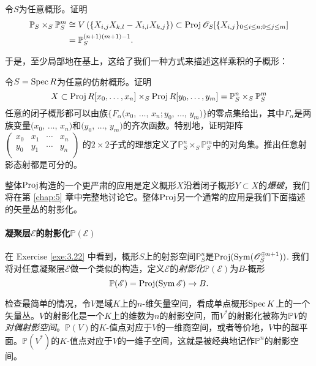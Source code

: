 \begin{exe}\label{exe:3.23}
令$S$为任意概形。证明
\begin{align*}
\mathbb P_S\times_S \mathbb P_S^m &\cong V\left(\{X_{i,j}X_{k,l}-X_{i,l}X_{k,j}\}\right)\subset \operatorname{Proj} \mathscr{O}_S[\{X_{i,j}\}_{0\leq i\leq n;0\leq j\leq m}]\\
& = \mathbb P_S^{(n+1)(m+1)-1}.
\end{align*}
\end{exe}

于是，至少局部地在基上，这给了我们一种方式来描述这样乘积的子概形：

\begin{exe}\label{exe:3.24}
令$S=\operatorname{Spec} R$为任意的仿射概形。证明
\[
	X\subset \operatorname{Proj} R[x_0,\dots,x_n]\times_S \operatorname{Proj} R[y_0,\dots,y_m]=\mathbb P^n_S\times_S\mathbb P^m_S
\]
任意的闭子概形都可以由族$\{F_\alpha(x_0$, $\dots$, $x_n;y_0$, $\dots$, $y_m)\}$的零点集给出，其中$F_{\alpha}$是两族变量$(x_0$, $\dots$, $x_n)$和$(y_0$, $\dots$, $y_m)$的齐次函数。特别地，证明矩阵
$
\begin{pmatrix}
x_0&x_1&\cdots &x_n\\
y_0&y_1&\cdots &y_n\\
\end{pmatrix}
$
的$2\times 2$子式的理想定义了$\mathbb P^n_S\times_S\mathbb P^m_S$中的对角集。推出任意射影态射都是可分的。
\end{exe}

整体$\operatorname{Proj}$构造的一个更严肃的应用是定义概形$X$沿着闭子概形$Y\subset X$的\textit{爆破}，我们将在第 \ref{chap:5} 章中完整地讨论它。整体$\operatorname{Proj}$另一个通常的应用是我们下面描述的矢量丛的射影化。

\paragraph*{凝聚层\texorpdfstring{$\mathscr E$}{E}的射影化\texorpdfstring{$\mathbb P(\mathscr E)$}{P(E)}}
在 Exercise \ref{exe:3.22} 中看到，概形$S$上的射影空间$\mathbb P_S^n$是$\operatorname{Proj}(\operatorname{Sym}(\mathscr{O}_S^{\oplus n+1}))$. 我们将对任意凝聚层$\mathscr E$做一个类似的构造，定义$\mathscr E$的\textit{射影化}$\mathbb P(\mathscr E)$为$B$-概形
\[
	\mathbb P(\mathscr E)=\operatorname{Proj}(\operatorname{Sym} \mathscr E)\to B.
\]

检查最简单的情况，令$V$是域$K$上的$n$-维矢量空间，看成单点概形$\operatorname{Spec} K$上的一个矢量丛。$V$的射影化是一个$K$上的维数为$n$的射影空间，而$V^*$的射影化被称为$\mathbb PV$的\textit{对偶射影空间}。$\mathbb P(V)$的$K$-值点对应于$V$的一维商空间，或者等价地，$V$中的超平面。$\mathbb P(V^*)$的$K$-值点对应于$V$的一维子空间，这就是被经典地记作$\mathbb P^n$的射影空间。

